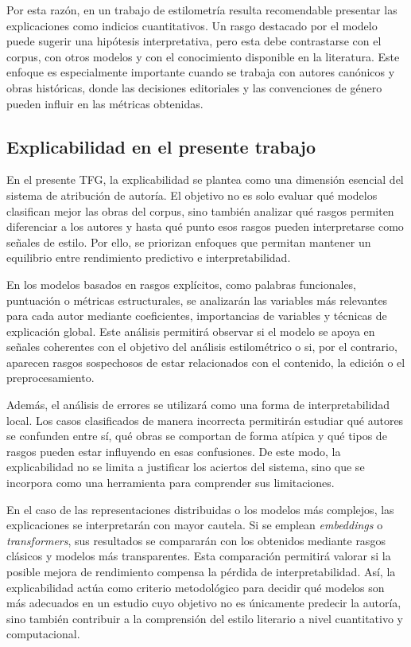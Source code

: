 \documentclass[IB]{TFUOC}%
\begin{document}
Por esta razón, en un trabajo de estilometría resulta recomendable presentar las explicaciones como indicios cuantitativos. Un rasgo destacado por el modelo puede sugerir una hipótesis interpretativa, pero esta debe contrastarse con el corpus, con otros modelos y con el conocimiento disponible en la literatura. Este enfoque es especialmente importante cuando se trabaja con autores canónicos y obras históricas, donde las decisiones editoriales y las convenciones de género pueden influir en las métricas obtenidas.

\subsection{Explicabilidad en el presente trabajo}

En el presente TFG, la explicabilidad se plantea como una dimensión esencial del sistema de atribución de autoría. El objetivo no es solo evaluar qué modelos clasifican mejor las obras del corpus, sino también analizar qué rasgos permiten diferenciar a los autores y hasta qué punto esos rasgos pueden interpretarse como señales de estilo. Por ello, se priorizan enfoques que permitan mantener un equilibrio entre rendimiento predictivo e interpretabilidad.

En los modelos basados en rasgos explícitos, como palabras funcionales, puntuación o métricas estructurales, se analizarán las variables más relevantes para cada autor mediante coeficientes, importancias de variables y técnicas de explicación global. Este análisis permitirá observar si el modelo se apoya en señales coherentes con el objetivo del análisis estilométrico o si, por el contrario, aparecen rasgos sospechosos de estar relacionados con el contenido, la edición o el preprocesamiento.

Además, el análisis de errores se utilizará como una forma de interpretabilidad local. Los casos clasificados de manera incorrecta permitirán estudiar qué autores se confunden entre sí, qué obras se comportan de forma atípica y qué tipos de rasgos pueden estar influyendo en esas confusiones. De este modo, la explicabilidad no se limita a justificar los aciertos del sistema, sino que se incorpora como una herramienta para comprender sus limitaciones.

En el caso de las representaciones distribuidas o los modelos más complejos, las explicaciones se interpretarán con mayor cautela. Si se emplean \textit{embeddings} o \textit{transformers}, sus resultados se compararán con los obtenidos mediante rasgos clásicos y modelos más transparentes. Esta comparación permitirá valorar si la posible mejora de rendimiento compensa la pérdida de interpretabilidad. Así, la explicabilidad actúa como criterio metodológico para decidir qué modelos son más adecuados en un estudio cuyo objetivo no es únicamente predecir la autoría, sino también contribuir a la comprensión del estilo literario a nivel cuantitativo y computacional.
\end{document}
